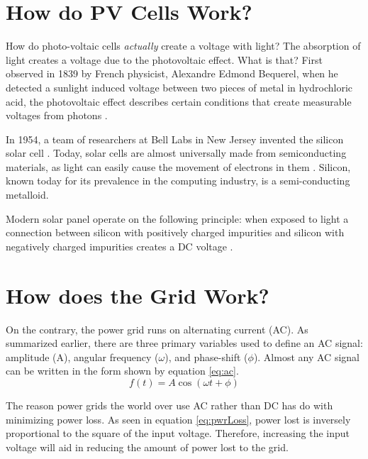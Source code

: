 \documentclass[journal]{IEEEtran}
\begin{document}
	\section{How do PV Cells Work?}
	How do photo-voltaic cells \textit{actually} create a voltage with light? The absorption of light creates a voltage due to the photovoltaic effect. What is that? First observed in 1839 by French physicist, Alexandre Edmond Bequerel, when he detected a sunlight induced voltage between two pieces of metal in hydrochloric acid, the photovoltaic effect describes certain conditions that create measurable voltages from photons \citep{Yang2019}.
	
	In 1954, a team of researchers at Bell Labs in New Jersey invented the silicon solar cell \citep{Yang2019}. Today, solar cells are almost universally made from semiconducting materials, as light can easily cause the movement of electrons in them \cite{Luque2011}.
	Silicon, known today for its prevalence in the computing industry, is a semi-conducting metalloid. 
	
	Modern solar panel operate on the following principle: when exposed to light a connection between silicon with positively charged impurities and silicon with negatively charged impurities creates a DC voltage \citep{Luque2011}.
	
	\section{How does the Grid Work?}
	On the contrary, the power grid runs on alternating current (AC). As summarized earlier, there are three primary variables used to define an AC signal: amplitude (A), angular frequency ($\omega$), and phase-shift ($\phi$). Almost any AC signal can be written in the form shown by equation \ref{eq:ac}. 
	\begin{equation}
		\label{eq:ac}
		f(t) = A\cos(\omega t + \phi)
	\end{equation}

	The reason power grids the world over use AC rather than DC has do with minimizing power loss. As seen in equation \ref{eq:pwrLoss}, power lost is inversely proportional to the square of the input voltage. Therefore, increasing the input voltage will aid in reducing the amount of power lost to the grid. 
	
\end{document}
